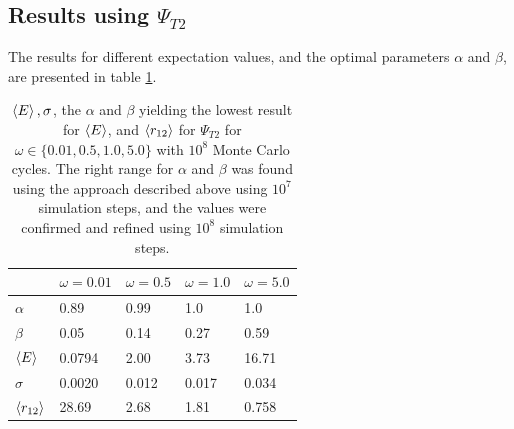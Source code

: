 \documentclass[10pt,a4paper]{article}
\begin{document}
\subsection{Results using $\Psi_{T2}$}
The results for different expectation values, and the optimal parameters $\alpha$ and $\beta$, are presented in table \ref{table3}. 
\begin{table}[H]
\centering
\caption[$\braket{E},\sigma$, $\alpha$,$\beta$ and  $\braket{r_{12}}$]{$\braket{E},\sigma$, the $\alpha$ and $\beta$ yielding the lowest result for  $\braket{E}$, and $\braket{r_{12}}$ for $\Psi_{T2}$ for $\omega\in\{0.01,0.5,1.0,5.0\}$ with $10^8$ Monte Carlo cycles. The right range for $\alpha$ and $\beta$ was found using the approach described above using $10^7$ simulation steps, and the values were confirmed and refined using  $10^8$ simulation steps. }

\begin{tabular}{|l|l|l|l|l|}
\hline
                  & $\omega=0.01$ & $\omega=0.5$ & $\omega=1.0$ & $\omega=5.0$ \\ \hline
$\alpha$          & 0.89          & 0.99         & 1.0          & 1.0          \\ \hline
$\beta$           & 0.05          & 0.14         & 0.27         & 0.59         \\ \hline
$\braket{E}$      & 0.0794        & 2.00         & 3.73         & 16.71        \\ \hline
$\sigma$          & 0.0020        & 0.012        & 0.017        & 0.034        \\ \hline
$\braket{r_{12}}$ & 28.69         & 2.68         & 1.81         & 0.758        \\ \hline
\end{tabular}\label{table3}
\end{table}
\end{document}
